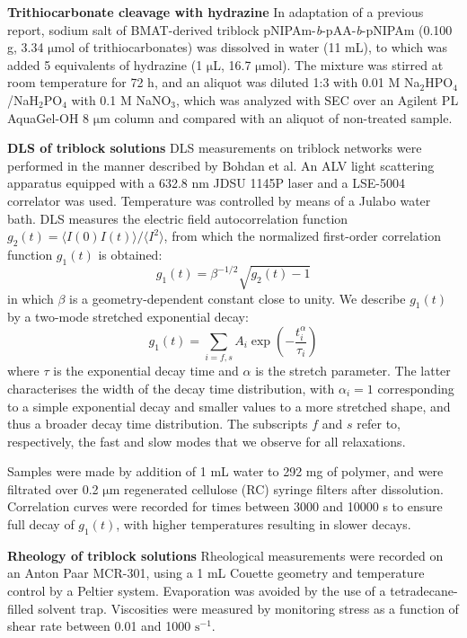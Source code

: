 \documentclass{article}
\begin{document}
\textbf{Trithiocarbonate cleavage with hydrazine}
In adaptation of a previous report,\cite{Shen2010}  
sodium salt of BMAT-derived triblock pNIPAm-\emph{b}-pAA-\emph{b}-pNIPAm (0.100 g, 3.34 $\mathrm{\mu}$mol of
trithiocarbonates) was dissolved in water (11 mL), to which was added 5 equivalents of
hydrazine (1 $\mathrm{\mu}$L, 16.7 $\mathrm{\mu}$mol). The mixture was stirred at room temperature
for 72 h, and an aliquot was diluted 1:3 with 0.01 M Na$_2$HPO$_4$/NaH$_2$PO$_4$ with
0.1 M NaNO$_3$, which was analyzed with SEC over an Agilent PL AquaGel-OH 8 $\mathrm{\mu}$m column
and compared with an aliquot of non-treated sample.

\textbf{DLS of triblock solutions}
DLS measurements on triblock networks were performed in the manner described by
Bohdan et al.\cite{Bohdan2016} An ALV light scattering apparatus 
equipped with a 632.8 nm JDSU 1145P laser and a LSE-5004 correlator was used. Temperature was 
controlled by means of a Julabo water bath. DLS measures the electric field autocorrelation function 
$g_2(t) = {\langle I(0)I(t) \rangle}/{\langle I^2 \rangle}$, from which the normalized 
first-order correlation function $g_1(t)$ is obtained:
\begin{equation}
g_1(t) = \beta^{-1/2}\sqrt{g_2(t) - 1}
\end{equation}
in which $\beta$ is a geometry-dependent constant close to unity. We describe 
$g_1(t)$ by a two-mode stretched exponential decay:
\begin{equation} \label{eqn:bistrexp}
g_1(t) = \sum\limits_{i=f,s}A_i\exp(-\frac{t^\alpha_i}{\tau_i})
\end{equation}
where $\tau$ is the exponential decay time and $\alpha$ is the stretch parameter. The latter
characterises the width of the decay time distribution, with $\alpha_i=1$ corresponding to
a simple exponential decay and smaller values to a more stretched shape, and thus a broader
decay time distribution. The subscripts $f$ and $s$ refer to, respectively, the fast and
slow modes that we observe for all relaxations.\cite{Thuresson1999} 

Samples were made by addition of 1 mL water to 292 mg of polymer, and were filtrated over 
0.2 $\mathrm{\mu m}$ regenerated cellulose (RC) syringe filters after dissolution. 
Correlation curves were recorded for times between 3000 and 10000 s to ensure full 
decay of $g_1(t)$, with higher temperatures resulting in slower decays.

\textbf{Rheology of triblock solutions}
Rheological measurements were recorded on an Anton Paar MCR-301, using a 1 mL Couette geometry and temperature
control by a Peltier system. Evaporation was avoided by the use of a tetradecane-filled solvent trap. Viscosities
were measured by monitoring stress as a function of shear rate between 0.01 and 1000 $\mathrm{s}^{-1}$.
\end{document}
